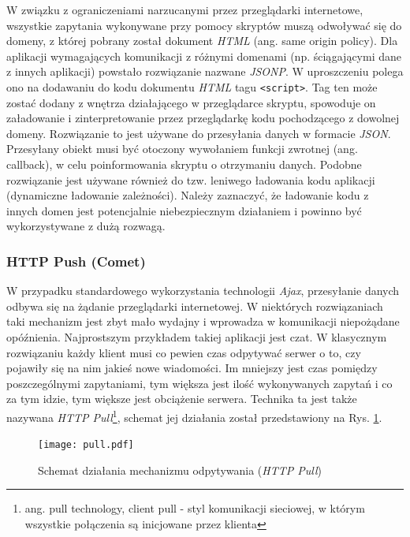 \documentclass[a4paper,12pt]{article}
\providecommand{\imref}[1]{Rys. \ref{#1}} %
\begin{document}
W związku z ograniczeniami narzucanymi przez przeglądarki internetowe,
wszystkie zapytania wykonywane przy pomocy skryptów muszą odwoływać
się do domeny, z której pobrany został dokument
\emph{HTML}\cite{origin} (ang. same origin policy). Dla aplikacji
wymagających komunikacji z różnymi domenami (np. ściągającymi dane z
innych aplikacji) powstało rozwiązanie nazwane \emph{JSONP}. W
uproszczeniu polega ono na dodawaniu do kodu dokumentu \emph{HTML}
tagu \texttt{<script>}. Tag ten może zostać dodany z wnętrza
działającego w przeglądarce skryptu, spowoduje on załadowanie i
zinterpretowanie przez przeglądarkę kodu pochodzącego z dowolnej
domeny. Rozwiązanie to jest używane do przesyłania danych w formacie
\emph{JSON}. Przesyłany obiekt musi być otoczony wywołaniem funkcji
zwrotnej (ang. callback), w celu poinformowania skryptu o otrzymaniu
danych. Podobne rozwiązanie jest używane również do tzw. leniwego
ładowania kodu aplikacji (dynamiczne ładowanie zależności). Należy
zaznaczyć, że ładowanie kodu z innych domen jest potencjalnie
niebezpiecznym działaniem i powinno być wykorzystywane z dużą rozwagą.

\subsubsection{HTTP Push (Comet)}
W przypadku standardowego wykorzystania technologii \emph{Ajax},
przesyłanie danych odbywa się na żądanie przeglądarki internetowej. W
niektórych rozwiązaniach taki mechanizm jest zbyt mało wydajny i
wprowadza w komunikacji niepożądane opóźnienia. Najprostszym
przykładem takiej aplikacji jest czat. W klasycznym rozwiązaniu każdy
klient musi co pewien czas odpytywać serwer o to, czy pojawiły się na
nim jakieś nowe wiadomości. Im mniejszy jest czas pomiędzy
poszczególnymi zapytaniami, tym większa jest ilość wykonywanych
zapytań i co za tym idzie, tym większe jest obciążenie
serwera. Technika ta jest także nazywana \emph{HTTP
  Pull}\footnote{ang. pull technology, client pull - styl komunikacji
  sieciowej, w którym wszystkie połączenia są inicjowane przez
  klienta\cite{pull}}, schemat jej działania został przedstawiony na
\imref{pull}.

\begin{figure}[ht]
  \begin{center}
    \texttt{[image: pull.pdf]}
  \end{center}
  \caption{Schemat działania mechanizmu odpytywania (\emph{HTTP
      Pull})}
  \label{pull}
\end{figure}
\end{document}
